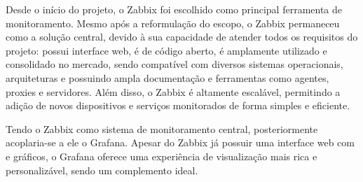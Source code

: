 Desde o início do projeto, o Zabbix foi escolhido como principal ferramenta de monitoramento. Mesmo após a reformulação do escopo, o Zabbix permaneceu como a solução central, devido à sua capacidade de atender todos os requisitos do projeto: possui interface web, é de código aberto, é amplamente utilizado e consolidado no mercado, sendo compatível com diversos sistemas operacionais, arquiteturas e possuindo ampla documentação e ferramentas como agentes, proxies e servidores. Além disso, o Zabbix é altamente escalável, permitindo a adição de novos dispositivos e serviços monitorados de forma simples e eficiente.

Tendo o Zabbix como sistema de monitoramento central, posteriormente acoplaria-se a ele o Grafana. Apesar do Zabbix já possuir uma interface web com  e gráficos, o Grafana oferece uma experiência de visualização mais rica e personalizável, sendo um complemento ideal.


